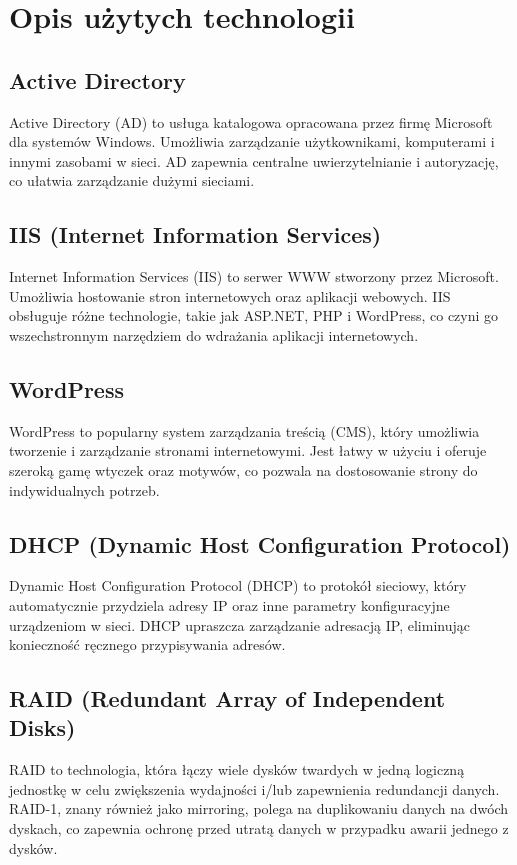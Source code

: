 \newpage
\section{Opis użytych technologii}		%

\subsection{Active Directory}
Active Directory (AD) to usługa katalogowa opracowana przez firmę Microsoft dla systemów Windows. Umożliwia zarządzanie użytkownikami, komputerami i innymi zasobami w sieci. AD zapewnia centralne uwierzytelnianie i autoryzację, co ułatwia zarządzanie dużymi sieciami.

\subsection{IIS (Internet Information Services)}
Internet Information Services (IIS) to serwer WWW stworzony przez Microsoft. Umożliwia hostowanie stron internetowych oraz aplikacji webowych. IIS obsługuje różne technologie, takie jak ASP.NET, PHP i WordPress, co czyni go wszechstronnym narzędziem do wdrażania aplikacji internetowych.

\subsection{WordPress}
WordPress to popularny system zarządzania treścią (CMS), który umożliwia tworzenie i zarządzanie stronami internetowymi. Jest łatwy w użyciu i oferuje szeroką gamę wtyczek oraz motywów, co pozwala na dostosowanie strony do indywidualnych potrzeb.

\subsection{DHCP (Dynamic Host Configuration Protocol)}
Dynamic Host Configuration Protocol (DHCP) to protokół sieciowy, który automatycznie przydziela adresy IP oraz inne parametry konfiguracyjne urządzeniom w sieci. DHCP upraszcza zarządzanie adresacją IP, eliminując konieczność ręcznego przypisywania adresów.

\subsection{RAID (Redundant Array of Independent Disks)}
RAID to technologia, która łączy wiele dysków twardych w jedną logiczną jednostkę w celu zwiększenia wydajności i/lub zapewnienia redundancji danych. RAID-1, znany również jako mirroring, polega na duplikowaniu danych na dwóch dyskach, co zapewnia ochronę przed utratą danych w przypadku awarii jednego z dysków.

